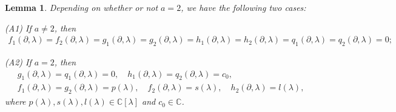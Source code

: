 \documentclass[11pt,letterpaper,reqno]{amsart}
\newtheorem{lemma}[theorem]{Lemma}
\theoremstyle{definition}
\numberwithin{equation}{section}
\begin{document}
\begin{lemma}\label{lems1}
Depending on whether or not $a=2$, we have the following two cases:

(A1) If $a\neq2$, then
\begin{align*}
f_1(\partial, \lambda)=f_2(\partial, \lambda)=g_1(\partial, \lambda)=g_2(\partial, \lambda)=h_1(\partial, \lambda)=h_2(\partial, \lambda)=q_1(\partial, \lambda)=q_2(\partial, \lambda)=0;
\end{align*}

(A2) If $a=2$, then
\begin{align*}
&g_1(\partial, \lambda)=q_1(\partial, \lambda)=0,\quad
h_1(\partial, \lambda)=q_2(\partial, \lambda)=c_0,\\
&f_1(\partial, \lambda)=g_2(\partial, \lambda)=p(\lambda),\quad
f_2(\partial, \lambda)=s(\lambda),\quad
h_2(\partial, \lambda)=l(\lambda),
\end{align*}
where $p(\lambda),s(\lambda),l(\lambda)\in\mathbb{C}[\lambda]$ and $c_0\in\mathbb{C}$.
\end{lemma}
\end{document}
